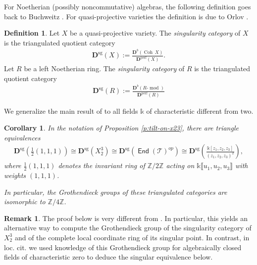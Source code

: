 \documentclass[a4paper,11pt, reqno]{amsart}
\def\Z{\mathbb Z}
\def\DD{\mathbf D}
\def\sT{\mathscr{T}}
\def\Coh{{\operatorname{Coh}}}
\def\mod{{\operatorname{mod}}}
\newcommand{\opname}[1]{\operatorname{\mathsf{#1}}}
\newcommand{\End}{\opname{End}}
\newcommand{\op}{^{op}}
\def\Dsg{\DD^{\mathrm{sg}}}
\def\Db{\DD^b}
\def\Dperf{\DD^{\mathrm{perf}}}
\theoremstyle{plain}
\newtheorem{corollary}[dummy]{Corollary}
\theoremstyle{definition}
\newtheorem{definition}[dummy]{Definition}
\newtheorem{remark}[dummy]{Remark}
\numberwithin{equation}{section}
\begin{document}
For Noetherian (possibly noncommutative) algebras, the following definition goes back to Buchweitz \cite{Buchweitz}. For quasi-projective varieties the definition is due to Orlov \cite{orlov-sing-1}.

\begin{definition}
    Let $X$ be a quasi-projective variety. The \emph{singularity category} of $X$ is the triangulated quotient category
    \begin{align}
        \Dsg(X):=\frac{\Db(\Coh \, X)}{\Dperf(X)}. 
    \end{align}
    Let $R$ be a left Noetherian ring. The \emph{singularity category} of $R$ is the triangulated quotient category
    \begin{align}
        \Dsg(R):=\frac{\Db(R\mbox{-}\mod )}{\Dperf(R)} 
    \end{align}
\end{definition}

\noindent
We generalize
 the main result of \cite{KalckNewSingular} to all  
 fields $\mathbb{k}$ of characteristic different from two.





\begin{corollary}\label{C:SingEq}
   In the notation of Proposition \ref{p:tilt-on-x23}, there are triangle equivalences
   \begin{align}\label{eq:singequivalences}
       \Dsg\left(\frac{1}{2}(1,1,1) \right) \cong \Dsg(X_2^3) \cong \Dsg(\End(\sT)\op) \cong \Dsg\left(\frac{\mathbb{k}[z_1, z_2, z_3]}{(z_1, z_2, z_3)^2}\right),
   \end{align}
   where $\frac{1}{2}(1,1,1)$ denotes the invariant ring of $\Z/2\Z$ acting on $\mathbb{k}\llbracket u_1, u_2, u_3\rrbracket$ with weights $(1, 1, 1)$.
   
   In particular, the Grothendieck groups of these triangulated categories are isomorphic to $\Z/4\Z$.
\end{corollary}

\begin{remark}
    The proof below is very different from \cite{KalckNewSingular}. In particular, this yields an alternative way to compute the Grothendieck group of the singularity category of $X_2^3$ and of the complete local coordinate ring of its singular point. In contrast, in loc. cit. we used knowledge of this Grothendieck group for algebraically closed fields of characteristic zero
\cite{pavic-shinder} to deduce the singular equivalence below.
\end{remark}
\end{document}
